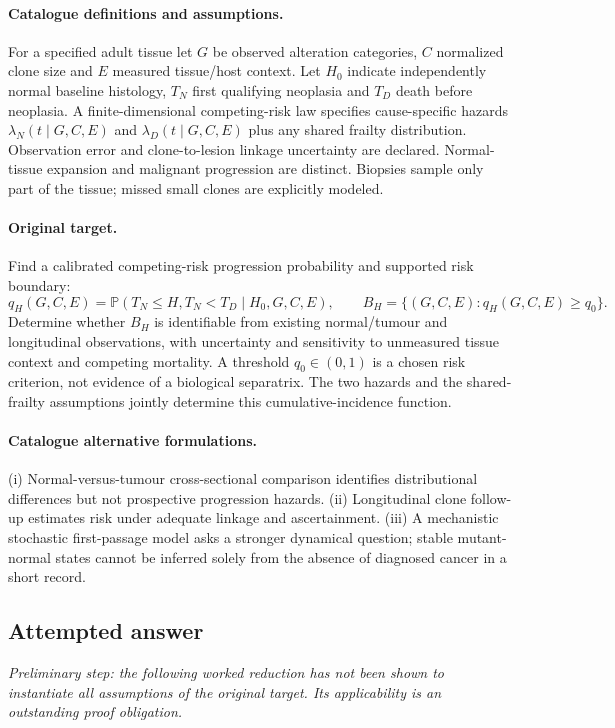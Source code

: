 \documentclass[11pt]{article}
\begin{document}
\paragraph{Catalogue definitions and assumptions.}
For a specified adult tissue let $G$ be observed alteration categories, $C$ normalized clone size and $E$ measured tissue/host context. Let $H_0$ indicate independently normal baseline histology, $T_N$ first qualifying neoplasia and $T_D$ death before neoplasia. A finite-dimensional competing-risk law specifies cause-specific hazards $\lambda_N(t\mid G,C,E)$ and $\lambda_D(t\mid G,C,E)$ plus any shared frailty distribution. Observation error and clone-to-lesion linkage uncertainty are declared. Normal-tissue expansion and malignant progression are distinct. Biopsies sample only part of the tissue; missed small clones are explicitly modeled.
\paragraph{Original target.}
Find a calibrated competing-risk progression probability and supported risk boundary:
\[q_H(G,C,E)=\mathbb{P}(T_N\leq H,T_N<T_D\mid H_0,G,C,E),\qquad
B_H=\{(G,C,E):q_H(G,C,E)\geq q_0\}.\]
Determine whether $B_H$ is identifiable from existing normal/tumour and longitudinal observations, with uncertainty and sensitivity to unmeasured tissue context and competing mortality. A threshold $q_0\in(0,1)$ is a chosen risk criterion, not evidence of a biological separatrix. The two hazards and the shared-frailty assumptions jointly determine this cumulative-incidence function.
\paragraph{Catalogue alternative formulations.}
(i) Normal-versus-tumour cross-sectional comparison identifies distributional differences but not prospective progression hazards. (ii) Longitudinal clone follow-up estimates risk under adequate linkage and ascertainment. (iii) A mechanistic stochastic first-passage model asks a stronger dynamical question; stable mutant-normal states cannot be inferred solely from the absence of diagnosed cancer in a short record.
\subsection{Attempted answer}
\noindent\emph{Preliminary step: the following worked reduction has not been shown to instantiate all assumptions of the original target. Its applicability is an outstanding proof obligation.}
\end{document}
